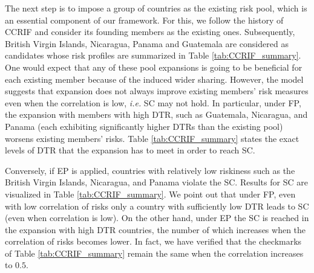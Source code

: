 \documentclass[fleqn,mnsc,nonblindrev]{informs4}
\begin{document}
The next step is to impose a group of countries as the existing risk pool, which is an essential component of our framework. For this, we follow the history of CCRIF and consider its founding members as the existing ones. Subsequently, British Virgin Islands, Nicaragua, Panama and Guatemala are considered as candidates whose risk profiles are summarized in Table \ref{tab:CCRIF_summary}. One would expect that any of these pool expansions is going to be beneficial for each existing member because of the induced wider sharing. However, the model suggests that expansion does not always improve existing members' risk measures even when the correlation is low, \textit{i.e.} SC may not hold. In particular, under FP, the expansion with members with high DTR, such as Guatemala, Nicaragua, and Panama (each exhibiting significantly higher DTRs than the existing pool) worsens existing members' risks. Table \ref{tab:CCRIF_summary} states the exact levels of DTR that the expansion has to meet in order to reach SC. 

Conversely, if EP is applied, countries with relatively low riskiness such as the British Virgin Islands, Nicaragua, and Panama violate the SC. Results for SC are visualized in Table \ref{tab:CCRIF_summary}. We point out that under FP, even with low correlation of risks only a country with sufficiently low DTR leads to SC (even when correlation is low). On the other hand, under EP the SC is reached in the expansion with high DTR countries, the number of which increases when the correlation of risks becomes lower. In fact, we have verified that the checkmarks of Table \ref{tab:CCRIF_summary} remain the same when the correlation increases to $0.5$.  
\end{document}
